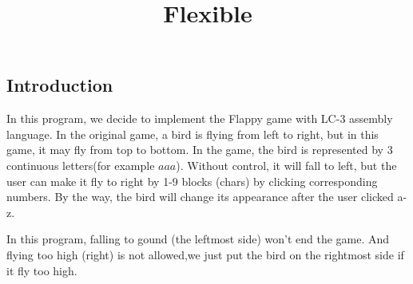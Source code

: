 \documentclass[twoside]{article}
\begin{document}
\begin{CJK*}{UTF8}{gbsn}
	\title{Flexible}
	\date{}

	\section{Introduction}
	In this program, we decide to implement the Flappy game with LC-3 assembly language. In the original game, a bird is flying from left to right, but in this game, it may fly from top to bottom. In the game, the bird is represented by 3 continuous letters(for example $aaa$). Without control, it will fall to left, but the user can make it fly to right by 1-9 blocks (chars) by clicking corresponding numbers. By the way, the bird will change its appearance after the user clicked a-z.
	
	In this program, falling to gound (the leftmost side) won't end the game. And flying too high (right) is not allowed,we just put the bird on the rightmost side if it fly too high.
	

\end{CJK*}
\end{document}
